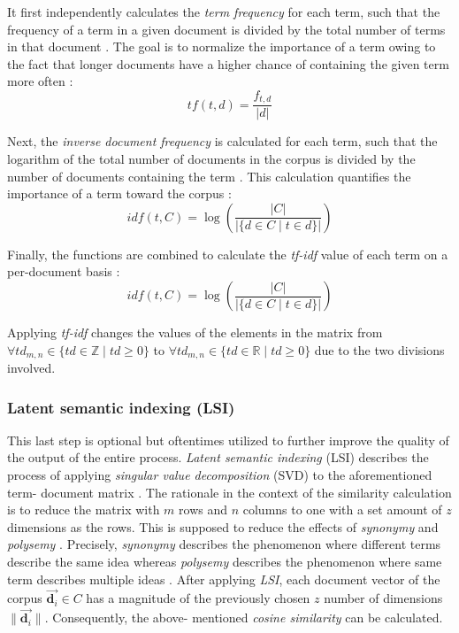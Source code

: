 \documentclass[12pt,a4paper]{report}
\begin{document}
It first independently calculates the \textit{term frequency} for each term,
such that the frequency of a term in a given document is divided by the total
number of terms in that document \cite{robertson2004tfidf}. The goal is to
normalize the importance of a term owing to the fact that longer documents have
a higher chance of containing the given term more often \cite{singhal2001ir}:
\[
  tf(t,d) = \frac{f_{t, d}}{\vert d \vert}
\]

Next, the \textit{inverse document frequency} is calculated for each term, such
that the logarithm of the total number of documents in the corpus is divided by
the number of documents containing the term \cite{robertson2004tfidf}. This
calculation quantifies the importance of a term toward the corpus \cite{singhal2001ir}:
\[
  idf(t,C) = \log \left(\frac{\vert C \vert}{\vert \{d \in C \mid t \in d\} \vert}\right)
\]

Finally, the functions are combined to calculate the \textit{tf-idf} value of
each term on a per-document basis \cite{robertson2004tfidf}:
\[
  idf(t,C) = \log \left(\frac{\vert C \vert}{\vert \{d \in C \mid t \in d\} \vert}\right)
\]

Applying \textit{tf-idf} changes the values of the elements in the matrix from
\(\forall td_{m,n} \in \{td \in \mathbb{Z} \mid td \ge 0\}\) to
\(\forall td_{m,n} \in \{td \in \mathbb{R} \mid td \ge 0\}\) due to the
two divisions involved.


\subsubsection{Latent semantic indexing (LSI)}
This last step is optional but
oftentimes utilized to further improve the quality of the output of the entire
process. \textit{Latent semantic indexing} (LSI) describes the process of
applying \textit{singular value decomposition} (SVD) to the aforementioned term\hyp
document matrix \cite{deerwester1990lsi}. The rationale in the context of the
similarity calculation is to reduce the matrix with \(m\) rows and \(n\)
columns to one with a set amount of \(z\) dimensions as the rows. This is
supposed to reduce the effects of \textit{synonymy} and \textit{polysemy}
\cite{deerwester1990lsi}.
Precisely, \textit{synonymy} describes the phenomenon where
different terms describe the same idea \cite{press2011oxford} whereas
\textit{polysemy} describes the phenomenon where same term describes
multiple ideas \cite{press2011oxford}.
After applying \textit{LSI}, each document vector of
the corpus \(\vec{\mathbf d_i} \in C\) has a magnitude of the previously chosen
\(z\) number of dimensions \(\|\vec{\mathbf d_i}\|\). Consequently, the above\hyp
mentioned \textit{cosine similarity} can be calculated.
\end{document}
